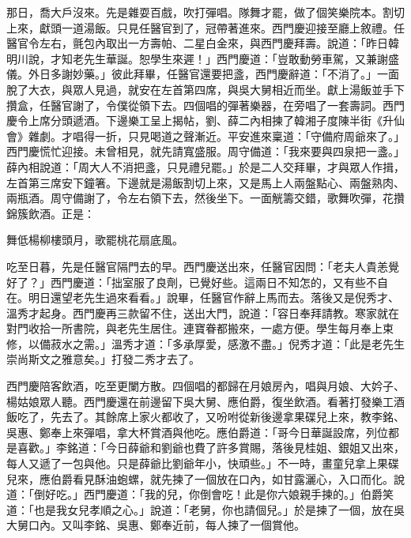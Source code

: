 那日，喬大戶沒來。先是雜耍百戲，吹打彈唱。隊舞才罷，做了個笑樂院本。割切上來，獻頭一道湯飯。只見任醫官到了，冠帶著進來。西門慶迎接至廳上敘禮。任醫官令左右，氈包內取出一方壽帕、二星白金來，與西門慶拜壽。說道：「昨日韓明川說，才知老先生華誕。恕學生來遲！」西門慶道：「豈敢動勞車駕，又兼謝盛儀。外日多謝妙藥。」彼此拜畢，任醫官還要把盞，西門慶辭道：「不消了。」一面脫了大衣，與眾人見過，就安在左首第四席，與吳大舅相近而坐。獻上湯飯並手下攢盒，任醫官謝了，令僕從領下去。四個唱的彈著樂器，在旁唱了一套壽詞。西門慶令上席分頭遞酒。下邊樂工呈上揭帖，劉、薛二內相揀了韓湘子度陳半街《升仙會》雜劇。才唱得一折，只見喝道之聲漸近。平安進來稟道：「守備府周爺來了。」西門慶慌忙迎接。未曾相見，就先請寬盛服。周守備道：「我來要與四泉把一盞。」薛內相說道：「周大人不消把盞，只見禮兒罷。」於是二人交拜畢，才與眾人作揖，左首第三席安下鐘箸。下邊就是湯飯割切上來，又是馬上人兩盤點心、兩盤熟肉、兩瓶酒。周守備謝了，令左右領下去，然後坐下。一面觥籌交錯，歌舞吹彈，花攢錦簇飲酒。正是：

舞低楊柳樓頭月，歌罷桃花扇底風。

吃至日暮，先是任醫官隔門去的早。西門慶送出來，任醫官因問：「老夫人貴恙覺好了？」西門慶道：「拙室服了良劑，已覺好些。這兩日不知怎的，又有些不自在。明日還望老先生過來看看。」說畢，任醫官作辭上馬而去。落後又是倪秀才、溫秀才起身。西門慶再三款留不住，送出大門，說道：「容日奉拜請教。寒家就在對門收拾一所書院，與老先生居住。連寶眷都搬來，一處方便。學生每月奉上束修，以備菽水之需。」溫秀才道：「多承厚愛，感激不盡。」倪秀才道：「此是老先生崇尚斯文之雅意矣。」打發二秀才去了。

西門慶陪客飲酒，吃至更闌方散。四個唱的都歸在月娘房內，唱與月娘、大妗子、楊姑娘眾人聽。西門慶還在前邊留下吳大舅、應伯爵，復坐飲酒。看著打發樂工酒飯吃了，先去了。其餘席上家火都收了，又吩咐從新後邊拿果碟兒上來，教李銘、吳惠、鄭奉上來彈唱，拿大杯賞酒與他吃。應伯爵道：「哥今日華誕設席，列位都是喜歡。」李銘道：「今日薛爺和劉爺也費了許多賞賜，落後見桂姐、銀姐又出來，每人又遞了一包與他。只是薛爺比劉爺年小，快頑些。」不一時，畫童兒拿上果碟兒來，應伯爵看見酥油蚫螺，就先揀了一個放在口內，如甘露灑心，入口而化。說道：「倒好吃。」西門慶道：「我的兒，你倒會吃！此是你六娘親手揀的。」伯爵笑道：「也是我女兒孝順之心。」說道：「老舅，你也請個兒。」於是揀了一個，放在吳大舅口內。又叫李銘、吳惠、鄭奉近前，每人揀了一個賞他。

